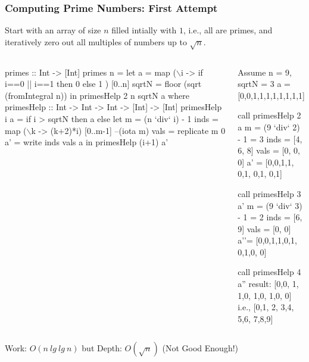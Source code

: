 \documentclass{beamer}
\renewcommand{\emph}[1]{\textcolor{structure}{#1}}
\newcommand{\emp}[1]{\textcolor{DikuRed}{ #1}}
\newcommand{\mymath}[1]{$ #1 $}
\begin{document}
\begin{frame}[fragile,t]
  \frametitle{Computing Prime Numbers: First Attempt}

Start with an array of size $n$ filled intially with $1$,
i.e., all are primes, and iteratively zero out all multiples
of numbers up to $\sqrt{n}$.

\begin{columns}
\begin{colorcode}[fontsize=\scriptsize]
primes :: Int -> [Int]
primes n = 
  let a = map (\mymath{\backslash}i -> if i==0 || i==1
                     then 0
                     else 1 ) [0..n]
      sqrtN = floor (sqrt (fromIntegral n))
  in  primesHelp 2 n sqrtN a
  where
    primesHelp :: Int -> Int -> Int 
               -> [Int] -> [Int]
    primesHelp i a = 
      if i > sqrtN then a
      else let m    = (n `div` i) - 1
               inds = \emph{map (\mymath{\backslash}k -> (k+2)*i)} 
                          \emph{[0..m-1]} --(iota m)
               vals = \emph{replicate m 0}
               a'   = \emph{write inds vals a}
           in  primesHelp (i+1) a'
\end{colorcode}
\begin{colorcode}[fontsize=\scriptsize]
Assume n = 9, sqrtN = 3 
a = [0,0,1,1,1,1,1,1,1,1]

call primesHelp 2 a
m    = (9 `div` 2) - 1 = 3
inds = [4, 6, 8]
vals = [0, 0, 0]
a' = [0,0,1,1,\emp{0},1,\emp{0},1,\emp{0},1]

call primesHelp 3 a'
m    = (9 `div` 3) - 1 = 2
inds = [6, 9]
vals = [0, 0]
a''= [0,0,1,1,0,1,\emp{0},1,0,\emp{0}]

call primesHelp 4 a''
result: [0,0,\emp{1},\emp{1},0,\emp{1},0,\emp{1},0,\emp{0}]
  i.e., [0,1,\emp{2},\emp{3},4,\emp{5},6,\emp{7},8,9]
\end{colorcode}
\end{columns}
\medskip

\emph{Work: $O(n \ lg \ lg \ n)$} but \emp{Depth: $O(\sqrt{n})$ (Not Good Enough!)}

\end{frame}
\end{document}
